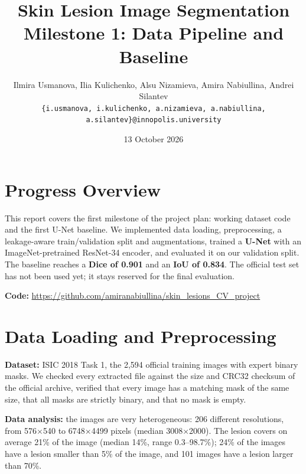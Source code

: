 \documentclass[11pt,a4paper]{article}
\title{\textbf{Skin Lesion Image Segmentation}\\ \large Milestone 1: Data Pipeline and Baseline}
\author{Ilmira Usmanova, Ilia Kulichenko, Alsu Nizamieva, Amira Nabiullina, Andrei Silantev\\
{\small\texttt{\{i.usmanova, i.kulichenko, a.nizamieva, a.nabiullina, a.silantev\}@innopolis.university}}}
\date{13 October 2026}
\begin{document}
\maketitle

\section{Progress Overview}

This report covers the first milestone of the project plan: working dataset code and the first
U-Net baseline. We implemented data loading, preprocessing, a leakage-aware train/validation split
and augmentations, trained a \textbf{U-Net} with an ImageNet-pretrained ResNet-34 encoder, and evaluated
it on our validation split. The baseline reaches a \textbf{Dice of 0.901} and an \textbf{IoU of
0.834}. The official test set has not been used yet; it stays reserved for the final evaluation.

\textbf{Code:} \url{https://github.com/amiranabiullina/skin_lesions_CV_project}

\section{Data Loading and Preprocessing}

\textbf{Dataset:} ISIC 2018 Task 1, the 2,594 official training images with expert binary
masks. We checked every extracted file against the size and CRC32 checksum of the official archive,
verified that every image has a matching mask of the same size, that all masks are strictly binary,
and that no mask is empty.

\textbf{Data analysis:} the images are very heterogeneous: 206 different resolutions, from
576$\times$540 to 6748$\times$4499 pixels (median 3008$\times$2000). The lesion covers on average
21\% of the image (median 14\%, range 0.3--98.7\%); 24\% of the images have a lesion smaller than
5\% of the image, and 101 images have a lesion larger than 70\%.
\end{document}
